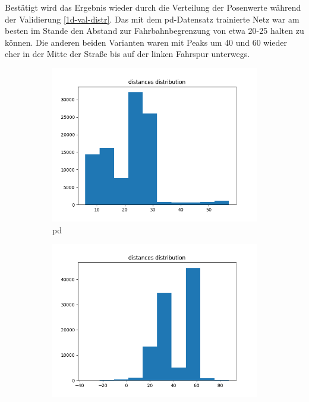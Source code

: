 Bestätigt wird das Ergebnis wieder durch die Verteilung der Posenwerte während der Validierung \ref{1d-val-distr}. Das mit dem \glqq\acs{pd}\grqq-Datensatz trainierte Netz war am besten im Stande den Abstand zur Fahrbahnbegrenzung von etwa 20-25 halten zu können. Die anderen beiden Varianten waren mit Peaks um 40 und 60 wieder eher in der Mitte der Straße bis auf der linken Fahrspur unterwegs.

\begin{figure}[H]
	\centering
	\begin{subfigure}[h]{0.3\textwidth}
		\centering
		\includegraphics[width=\linewidth]{kapitel5/images/eval/d-only/pd-distr.png}
		\caption{\glqq\acs{pd}\grqq}
		\label{1d-pd-val-distr}
	\end{subfigure}%
	\begin{subfigure}[h]{0.3\textwidth}
		\centering
		\includegraphics[width=\linewidth]{kapitel5/images/eval/d-only/pd-rand-distr.png}

\end{subfigure}
\end{figure}
